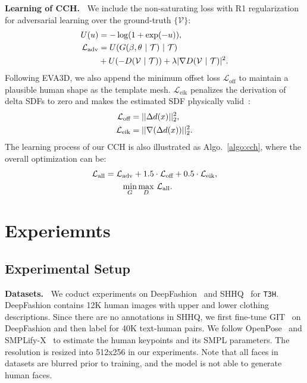 \documentclass[11pt]{article}
\begin{document}
\vspace{1ex} \noindent \textbf{Learning of CCH.~}
We include the non-saturating loss with R1 regularization~\cite{mescheder2018non-saturating} for adversarial learning over the ground-truth $\{\mathcal{V}\}$:
\begin{align}
    U(u) &= -\log(1+\exp(-u)), \notag \\
    \mathcal{L}_\text{adv} &= U(G(\beta, \theta~|~\mathcal{T})~|~\mathcal{T}) \label{eq:loss-adv} \\
    &+U(-D(\mathcal{V}~|~\mathcal{T}))+\lambda|\nabla D(\mathcal{V}~|~\mathcal{T})|^2. \notag
\end{align}
Following EVA3D, we also append the minimum offset loss $\mathcal{L}_\text{off}$ to maintain a plausible human shape as the template mesh. $\mathcal{L}_\text{eik}$ penalizes the derivation of delta SDFs to zero and makes the estimated SDF physically valid~\cite{gropp2020sdf}:
\begin{align}
    \mathcal{L}_\text{off} &= ||\Delta d(x)||_2^2, \notag \\
    \mathcal{L}_\text{eik} &= ||\nabla (\Delta d(x))||_2^2. \label{eq:loss-off}
\end{align}
The learning process of our CCH is also illustrated as Algo.~\ref{algo:cch}, where the overall optimization can be:
\begin{align}
    \mathcal{L}_\text{all} = \mathcal{L}_\text{adv}+1.5&\cdot\mathcal{L}_\text{off}+0.5\cdot\mathcal{L}_\text{eik}, \label{eq:loss-all} \\
    \min_G \max_D&~\mathcal{L}_\text{all}. \notag
\end{align}

\section{Experiemnts}
\subsection{Experimental Setup}
\textbf{Datasets.~}
We coduct experiments on DeepFashion~\cite{jiang2022text2human} and SHHQ~\cite{fu2022shhq} for \texttt{T3H}. DeepFashion contains 12K human images with upper and lower clothing descriptions. Since there are no annotations in SHHQ, we first fine-tune GIT~\cite{wang2022git} on DeepFashion and then label for 40K text-human pairs. We follow OpenPose~\cite{cao2019open-pose} and SMPLify-X~\cite{pavlakos2019smplify-x} to estimate the human keypoints and its SMPL parameters. The resolution is resized into 512x256 in our experiments. Note that all faces in datasets are blurred prior to training, and the model is not able to generate human faces.
\end{document}
